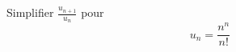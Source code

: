 Simplifier $\frac{u_{n+1}}{u_n}$ pour
\begin{displaymath}
 u_n=\frac{n^n}{n!}
\end{displaymath}
\bigskip  \bigskip \bigskip